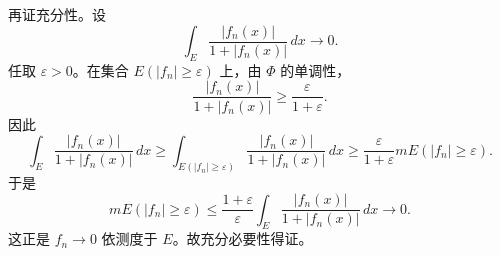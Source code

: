 \documentclass{article}
\begin{document}
	再证充分性。设
	\[
	\int_E\frac{|f_n(x)|}{1+|f_n(x)|}\,dx\to0.
	\]
	任取 $\varepsilon>0$。在集合 $E(|f_n|\ge\varepsilon)$ 上，由 $\Phi$ 的单调性，
	\[
	\frac{|f_n(x)|}{1+|f_n(x)|}\ge \frac{\varepsilon}{1+\varepsilon}.
	\]
	因此
	\[
	\int_E\frac{|f_n(x)|}{1+|f_n(x)|}\,dx
	\ge \int_{E(|f_n|\ge\varepsilon)}\frac{|f_n(x)|}{1+|f_n(x)|}\,dx
	\ge \frac{\varepsilon}{1+\varepsilon}mE(|f_n|\ge\varepsilon).
	\]
	于是
	\[
	mE(|f_n|\ge\varepsilon)
	\le \frac{1+\varepsilon}{\varepsilon}
	\int_E\frac{|f_n(x)|}{1+|f_n(x)|}\,dx\to0.
	\]
	这正是 $f_n\to0$ 依测度于 $E$。故充分必要性得证。
	
\end{document}

